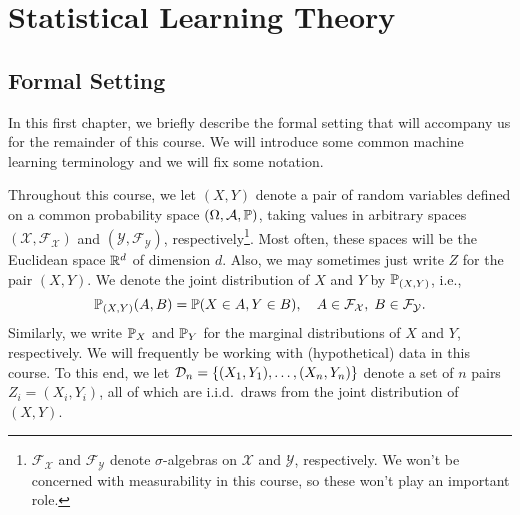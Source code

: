 \part{Statistical Learning Theory}

\chapter{Formal Setting}
\label{ch: formal setting}

In this first chapter, we briefly describe the formal setting that will accompany us for the remainder of this course. We will introduce some common machine learning terminology and we will fix some notation.

Throughout this course, we let $(X, Y)$ denote a pair of random variables defined on a common probability space $(\Omega, \mathcal{A}, \P)$, taking values in arbitrary spaces $(\mathcal{X}, \mathcal{F}_{\mathcal{X}})$ and $(\mathcal{Y}, \mathcal{F}_{\mathcal{Y}})$, respectively\footnote{$\mathcal{F}_{\mathcal{X}}$ and $\mathcal{F}_{\mathcal{Y}}$ denote $\sigma$-algebras on $\mathcal{X}$ and $\mathcal{Y}$, respectively. We won't be concerned with measurability in this course, so these won't play an important role.}. Most often, these spaces will be the Euclidean space $\R^d$ of dimension $d$. Also, we may sometimes just write $Z$ for the pair $(X, Y)$. We denote the joint distribution of $X$ and $Y$ by $\P_{(X, Y)}$, i.e.,
\[
    \P_{(X, Y)}(A, B) = \P(X \in A, Y \in B), \quad A \in \mathcal{F}_{\mathcal{X}}, \; B \in \mathcal{F}_{\mathcal{Y}}.
\]
Similarly, we write $\P_X$ and $\P_Y$ for the marginal distributions of $X$ and $Y$, respectively. We will frequently be working with (hypothetical) data in this course. To this end, we let $\mathcal{D}_n = \set{(X_1, Y_1), \dots, (X_n, Y_n)}$ denote a set of $n$ pairs $Z_i = (X_i, Y_i)$, all of which are i.i.d.\ draws from the joint distribution of $(X, Y)$.
